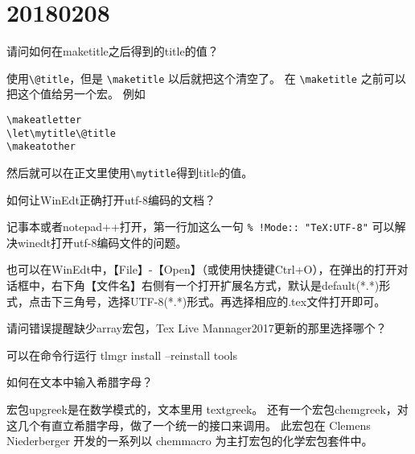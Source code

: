 \documentclass[QA.tex]{subfiles}
\begin{document}
%
%

\chapter{20180208}\label{ch180208}

\begin{qst}\label{Q2018020801}
 请问如何在maketitle之后得到的title的值？
\end{qst}
\ans 使用\verb|\@title|，但是 \verb|\maketitle| 以后就把这个清空了。
在 \verb|\maketitle| 之前可以把这个值给另一个宏。
例如
\begin{verbatim}
\makeatletter
\let\mytitle\@title
\makeatother
\end{verbatim}
然后就可以在正文里使用\verb|\mytitle|得到title的值。

\begin{qst}\label{Q2018020802}
 如何让WinEdt正确打开utf-8编码的文档？
\end{qst}
\ans 记事本或者notepad++打开，第一行加这么一句
\verb|% !Mode:: "TeX:UTF-8"|
可以解决winedt打开utf-8编码文件的问题。

也可以在WinEdt中，【File】-【Open】（或使用快捷键Ctrl+O），在弹出的打开对话框中，右下角【文件名】右侧有一个打开扩展名方式，默认是default(*.*)形式，点击下三角号，选择UTF-8(*.*)形式。再选择相应的.tex文件打开即可。

\begin{qst}\label{Q2018020803}
 请问错误提醒缺少array宏包，Tex Live Mannager2017更新的那里选择哪个？
\end{qst}
\ans 可以在命令行运行 tlmgr install --reinstall tools

\begin{qst}\label{Q2018020804}
 如何在文本中输入希腊字母？
\end{qst}
\ans 宏包upgreek是在数学模式的，文本里用 textgreek。
还有一个宏包chemgreek，对这几个有直立希腊字母，做了一个统一的接口来调用。 此宏包在 Clemens Niederberger 开发的一系列以 chemmacro 为主打宏包的化学宏包套件中。
\end{document}
